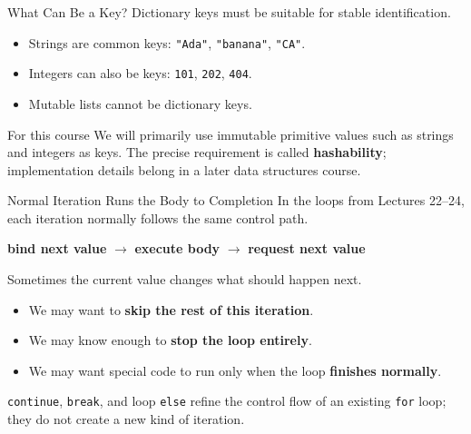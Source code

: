 \documentclass[aspectratio=169,10pt]{beamer}
\begin{document}
\begin{frame}{What Can Be a Key?}
  Dictionary keys must be suitable for stable identification.

  \begin{itemize}
    \item Strings are common keys: \texttt{"Ada"}, \texttt{"banana"}, \texttt{"CA"}.
    \item Integers can also be keys: \texttt{101}, \texttt{202}, \texttt{404}.
    \item Mutable lists cannot be dictionary keys.
  \end{itemize}

  \begin{alertblock}{For this course}
    We will primarily use immutable primitive values such as strings and integers as keys. The precise requirement is called \textbf{hashability}; implementation details belong in a later data structures course.
  \end{alertblock}
\end{frame}


\begin{frame}{Normal Iteration Runs the Body to Completion}
  In the loops from Lectures 22--24, each iteration normally follows the same control path.

  \begin{center}
    \textbf{bind next value} $\longrightarrow$ \textbf{execute body} $\longrightarrow$ \textbf{request next value}
  \end{center}

  Sometimes the current value changes what should happen next.

  \begin{itemize}
    \item We may want to \textbf{skip the rest of this iteration}.
    \item We may know enough to \textbf{stop the loop entirely}.
    \item We may want special code to run only when the loop \textbf{finishes normally}.
  \end{itemize}

  \begin{keyidea}
    \texttt{continue}, \texttt{break}, and loop \texttt{else} refine the control flow of an existing \texttt{for} loop; they do not create a new kind of iteration.
  \end{keyidea}
\end{frame}
\end{document}
